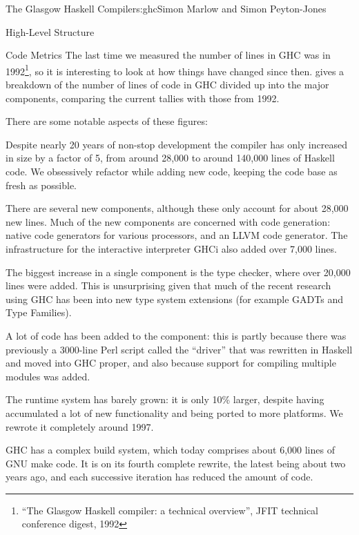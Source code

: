 \begin{aosachapter}{The Glasgow Haskell Compiler}{s:ghc}{Simon Marlow and Simon Peyton-Jones}
\begin{aosasect1}{High-Level Structure}
\begin{aosasect2}{Code Metrics}
The last time we measured the number of lines in GHC was in
1992\footnote{``The Glasgow Haskell compiler: a technical overview'',
  JFIT technical conference digest, 1992}, so it is interesting to
look at how things have changed since then.  
gives a breakdown of the number of lines of code in GHC divided up
into the major components, comparing the current tallies with those
from 1992.

There are some notable aspects of these figures:

\begin{aosaitemize}

\item Despite nearly 20 years of non-stop development the compiler has
  only increased in size by a factor of 5, from around 28,000 to
  around 140,000 lines of Haskell code.  We obsessively refactor while
  adding new code, keeping the code base as fresh as possible.

\item There are several new components, although these only account
  for about 28,000 new lines.  Much of the new components are
  concerned with code generation: native code generators for various
  processors, and an LLVM code generator.  The infrastructure for the
  interactive interpreter GHCi also added over 7,000 lines.

\item The biggest increase in a single component is the type checker,
  where over 20,000 lines were added.  This is unsurprising given that
  much of the recent research using GHC has been into new type system
  extensions (for example GADTs and Type Families).

\item A lot of code has been added to the  component: this
  is partly because there was previously a 3000-line Perl script
  called the ``driver'' that was rewritten in Haskell and moved into
  GHC proper, and also because support for compiling multiple modules
  was added.

\item The runtime system has barely grown: it is only 10\% larger,
  despite having accumulated a lot of new functionality and being
  ported to more platforms.  We rewrote it completely around 1997.

\item GHC has a complex build system, which today comprises about
  6,000 lines of GNU make code.  It is on its fourth complete rewrite,
  the latest being about two years ago, and each successive iteration
  has reduced the amount of code.


\end{aosaitemize}
\end{aosasect2}
\end{aosasect1}
\end{aosachapter}
